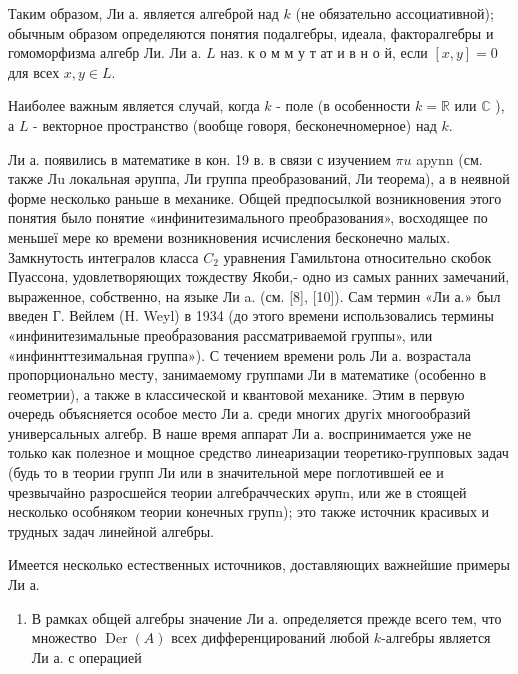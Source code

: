 \documentclass[10pt]{article}
\begin{document}
Таким образом, Ли а. является алгеброй над $k$ (не обязательно ассоциативной); обычным образом определяются понятия подалгебры, идеала, факторалгебры и гомоморфизма алгебр Ли. Ли а. $L$ наз. к о м м у т ат и в н о й, если $[x, y]=0$ для всех $x, y \in L$.



Наиболее важным является случай, когда $k$ - поле (в особенности $k=\mathbb{R}$ или $\mathbb{C}$ ), а $L$ - векторное пространство (вообще говоря, бесконечномерное) над $k$.



Ли а. появились в математике в кон. 19 в. в связи с изучением $\pi u$ apynn (см. также Лu локальная әруппа, Ли группа преобразований, Ли теорема), а в неявной форме несколько раньше в механике. Общей предпосылкой возникновения этого понятия было понятие «инфинитезимального преобразования», восходящее по меньшеї мере ко времени возникновения исчисления бесконечно малых. Замкнутость интегралов класса $C_{2}$ уравнения Гамильтона относительно скобок Пуассона, удовлетворяющих тождеству Якоби,- одно из самых ранних замечаний, выраженное, собственно, на языке Ли a. (см. [8], [10]). Сам термин «Ли а.» был введен Г. Вейлем (H. Weyl) в 1934 (до этого времени использовались термины «инфинитезимальные преоб́разования рассматриваемой группы», или «инфиннттезимальная группа»). С течением времени роль Ли а. возрастала пропорционально месту, занимаемому группами Ли в математике (особенно в геометрии), а также в классической и квантовой механике. Этим в первую очередь объясняется особое место Ли а. среди многих другіх многообразий универсальных алгебр. В наше время аппарат Ли а. воспринимается уже не только как полезное и мощное средство линеаризации теоретико-групповых задач (будь то в теории групп Ли или в значительной мере поглотившей ее и чрезвычайно разросшейся теории алгебрачческих әрупn, или же в стоящей несколько особняком теории конечных групn); это также источник красивых и трудных задач линейной алгебры.



Имеется несколько естественных источников, доставляющих важнейшие примеры Ли а.



\begin{enumerate}

  \item В рамках общей алгебры значение Ли а. определяется прежде всего тем, что множество $\operatorname{Der}(A)$ всех дифференцирований любой $k$-алгебры является Ли а. с операцией

\end{enumerate}
\end{document}
